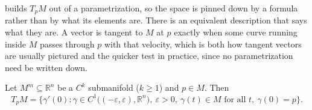 \begin{center}
\end{center}

 builds $T_pM$ out of a parametrization, so the space is pinned down by a
formula rather than by what its elements are. There is an equivalent description that says what
they are. A vector is tangent to $M$ at $p$ exactly when some curve running inside $M$ passes
through $p$ with that velocity, which is both how tangent vectors are usually pictured and the
quicker test in practice, since no parametrization need be written down.

\begin{proposition}
\label{prop:tangent_space_via_curves}
Let $M^m \subseteq \mathbb{R}^n$ be a $C^k$ submanifold ($k\geq1$) and $p \in M$. Then
\[T_pM = \big\{\gamma'(0) : \gamma \in C^1\big((-\varepsilon,\varepsilon), \mathbb{R}^n\big),\ \varepsilon>0,\ \gamma(t) \in M \text{ for all } t,\ \gamma(0)=p\big\}.\]
\end{proposition}

